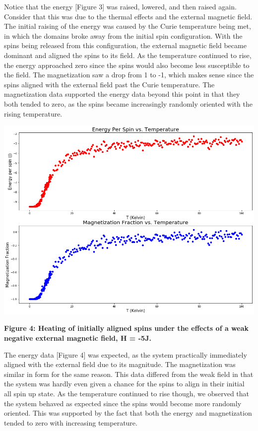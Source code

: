 \documentclass[11pt]{article}
\begin{document}
Notice that the energy [Figure 3] was raised, lowered, and then raised again. Consider that this was due to the thermal effects and the external magnetic field. The initial raising of the energy was caused by the Curie temperature being met, in which the domains broke away from the initial spin configuration. With the spins being released from this configuration, the external magnetic field became dominant and aligned the spins to its field. As the temperature continued to rise, the energy approached zero since the spins would also become less susceptible to the field. The magnetization saw a drop from 1 to -1, which makes sense since the spins aligned with the external field past the Curie temperature. The magnetization data supported the energy data beyond this point in that they both tended to zero, as the spins became increasingly randomly oriented with the rising temperature.

\begin{center}
    \includegraphics[width = \linewidth]{alignedNegFieldStrong.png}
    \caption{\textbf{Figure 4: Heating of initially aligned spins under the effects of a weak negative external magnetic field, H = -5J.}}
    \label{fig:plt1}
\end{center}

The energy data [Figure 4] was expected, as the system practically immediately aligned with the external field due to its magnitude. The magnetization was similar in form for the same reason. This data differed from the weak field in that the system was hardly even given a chance for the spins to align in their initial all spin up state. As the temperature continued to rise though, we observed that the system behaved as expected since the spins would become more randomly oriented. This was supported by the fact that both the energy and magnetization tended to zero with increasing temperature.
\end{document}
